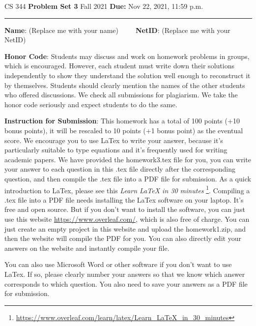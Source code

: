 \documentclass[12pt]{article}
\begin{document}
\noindent
CS 344 \hfill \textbf{Problem Set 3} \newline 
{Fall 2021} \hfill \textbf{Due:} Nov 22, 2021, 11:59 p.m.

\noindent
\rule{\linewidth}{0.4pt}
\vspace{.4cm}

\textbf{Name}: ({\color{blue}Replace me with your name})~~~~~\textbf{NetID}: ({\color{blue}Replace me with your NetID})

\vspace{.5cm}

\textbf{Honor Code}: Students may discuss and work on homework problems in groups, which is encouraged. However, each student must write down their solutions independently to show they understand the solution well enough to reconstruct it by themselves.  Students should clearly mention the names of the other students who offered discussions. We check all submissions for plagiarism. We take the honor code seriously and expect students to do the same.


\vspace{.5cm}

\textbf{Instruction for Submission}: This homework has a total of 100 points (+10 bonus points), it will be rescaled to 10 points (+1 bonus point) as the eventual score. We encourage you to use LaTex to write your answer, because it's particularly suitable to type equations and it's frequently used for writing academic papers. We have provided the homework3.tex file for you, you can write your answer to each question in this .tex file directly after the corresponding question, and then compile the .tex file into a PDF file for submission. As a quick introduction to LaTex, please see this \textit{Learn LaTeX in 30 minutes} \footnote{\url{https://www.overleaf.com/learn/latex/Learn_LaTeX_in_30_minutes}}. Compiling a .tex file into a PDF file needs installing the LaTex software on your laptop. It's free and open source. But if you don't want to install the software, you can just use this website \url{https://www.overleaf.com/}, which is also free of charge. You can just create an empty project in this website and upload the homework1.zip, and then the website will compile the PDF for you. You can also directly edit your answers on the website and instantly compile your file.

You can also use Microsoft Word or other software if you don't want to use LaTex. If so, please clearly number your answers so that we know which answer corresponds to which question. You also need to save your answers as a PDF file for submission.
\end{document}
